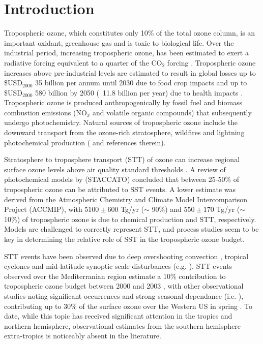 \documentclass{article}
\begin{document}
\section{Introduction}

    Tropospheric ozone, which constitutes only 10\% of the total ozone column, is an important oxidant, greenhouse gas and is toxic to biological life. 
    Over the industrial period, increasing tropospheric ozone, has been estimated to exert a radiative forcing equivalent to a quarter of the CO$_2$ forcing \citep{IPCC_Chapter2}. Tropospheric ozone increases above pre-industrial levels are estimated to result in global losses up to \$USD$_{2000}$ 35 billion per annum until 2030 due to food crop impacts \citep{Avnery2011} and up to \$USD$_{2000}$ 580 billion by 2050 (~11.8 billion per year) due to health impacts \citep{Selin2009}. Tropospheric ozone is produced anthropogenically by fossil fuel and biomass combustion emissions (NO$_x$ and volatile organic compounds) that subsequently undergo photochemistry. Natural sources of tropospheric ozone include the downward transport from the ozone-rich stratosphere, wildfires and lightning photochemical production (\citet{Jacobson2000} and references therein). 
 
    Stratosphere to troposphere transport (STT) of ozone can increase regional surface ozone levels above air quality standard thresholds \citep{Danielson1968, Lefohn2011, Langford2012, Zhang2014}. A review of photochemical models by \citet{Stohl2003} (STACCATO) concluded that between 25-50\% of tropospheric ozone can be attributed to SST events. A lower estimate was derived from the Atmospheric Chemistry and Climate Model Intercomparison Project (ACCMIP), \citep{Stevenson2006} with $5100\pm600$ Tg/yr ($\sim$ 90\%) and $550\pm170$ Tg/yr ($\sim$ 10\%) of tropospheric ozone is due to chemical production and STT, respectively. Models are challenged to correctly represent STT, and process studies seem to be key in determining the relative role of SST in the tropospheric ozone budget.
    
    STT events have been observed due to deep overshooting convection \citep{Frey2015}, tropical cyclones \citep{Das2016} and mid-latitude synoptic scale disturbances (e.g. \citet{Stohl2003,Mihalikova2012}). STT events observed over the Mediterranian region estimate a 10\% contribution to tropospheric ozone budget between 2000 and 2003 \citep{Galani2003}, with other observational studies noting significant occurrences and strong seasonal dependance (i.e. \citet{Lefohn2011}), contributing up to 30\% of the surface ozone over the Western US in spring \citep{Lin2012}. To date, while this topic has received significant attention in the tropics and northern hemisphere, observational estimates from the southern hemisphere extra-tropics is noticeably absent in the literature. 
    
\end{document}
